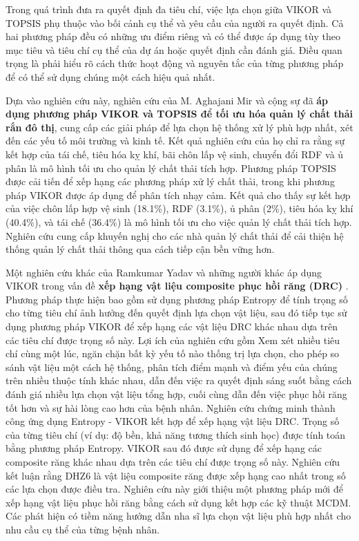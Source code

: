 Trong quá trình đưa ra quyết định đa tiêu chí, việc lựa chọn giữa VIKOR và TOPSIS phụ thuộc vào bối cảnh cụ thể và yêu cầu của người ra quyết định. Cả hai phương pháp đều có những ưu điểm riêng và có thể được áp dụng tùy theo mục tiêu và tiêu chí cụ thể của dự án hoặc quyết định cần đánh giá. Điều quan trọng là phải hiểu rõ cách thức hoạt động và nguyên tắc của từng phương pháp để có thể sử dụng chúng một cách hiệu quả nhất.

Dựa vào nghiên cứu này, nghiên cứu của M. Aghajani Mir và cộng sự đã \textbf{áp dụng phương pháp VIKOR và TOPSIS để tối ưu hóa quản lý chất thải rắn đô thị}, cung cấp các giải pháp để lựa chọn hệ thống xử lý phù hợp nhất, xét đến các yếu tố môi trường và kinh tế. Kết quả nghiên cứu của họ chỉ ra rằng sự kết hợp của tái chế, tiêu hóa kỵ khí, bãi chôn lấp vệ sinh, chuyển đổi RDF và ủ phân là mô hình tối ưu cho quản lý chất thải tích hợp. Phương pháp TOPSIS được cải tiến để xếp hạng các phương pháp xử lý chất thải, trong khi phương pháp VIKOR được áp dụng để phân tích nhạy cảm. Kết quả cho thấy sự kết hợp của việc chôn lấp hợp vệ sinh (18.1\%), RDF (3.1\%), ủ phân (2\%), tiêu hóa kỵ khí (40.4\%), và tái chế (36.4\%) là mô hình tối ưu cho việc quản lý chất thải tích hợp. Nghiên cứu cung cấp khuyến nghị cho các nhà quản lý chất thải để cải thiện hệ thống quản lý chất thải thông qua cách tiếp cận bền vững hơn.

Một nghiên cứu khác của Ramkumar Yadav và những người khác áp dụng VIKOR trong vấn đề \textbf{xếp hạng vật liệu composite phục hồi răng (DRC)} \cite{sciencedirect1}. Phương pháp thực hiện bao gồm sử dụng phương pháp Entropy để tính trọng số cho từng tiêu chí ảnh hưởng đến quyết định lựa chọn vật liệu, sau đó tiếp tục sử dụng phương pháp VIKOR để xếp hạng các vật liệu DRC khác nhau dựa trên các tiêu chí được trọng số này. Lợi ích của nghiên cứu gồm Xem xét nhiều tiêu chí cùng một lúc, ngăn chặn bất kỳ yếu tố nào thống trị lựa chọn, cho phép so sánh vật liệu một cách hệ thống, phân tích điểm mạnh và điểm yếu của chúng trên nhiều thuộc tính khác nhau, dẫn đến việc ra quyết định sáng suốt bằng cách đánh giá nhiều lựa chọn vật liệu tổng hợp, cuối cùng dẫn đến việc phục hồi răng tốt hơn và sự hài lòng cao hơn của bệnh nhân. Nghiên cứu chứng minh thành công ứng dụng Entropy - VIKOR kết hợp để xếp hạng vật liệu DRC. Trọng số của từng tiêu chí (ví dụ: độ bền, khả năng tương thích sinh học) được tính toán bằng phương pháp Entropy. VIKOR sau đó được sử dụng để xếp hạng các composite răng khác nhau dựa trên các tiêu chí được trọng số này. Nghiên cứu kết luận rằng DHZ6 là vật liệu composite răng được xếp hạng cao nhất trong số các lựa chọn được điều tra. Nghiên cứu này giới thiệu một phương pháp mới để xếp hạng vật liệu phục hồi răng bằng cách sử dụng kết hợp các kỹ thuật MCDM. Các phát hiện có tiềm năng hướng dẫn nha sĩ lựa chọn vật liệu phù hợp nhất cho nhu cầu cụ thể của từng bệnh nhân.

